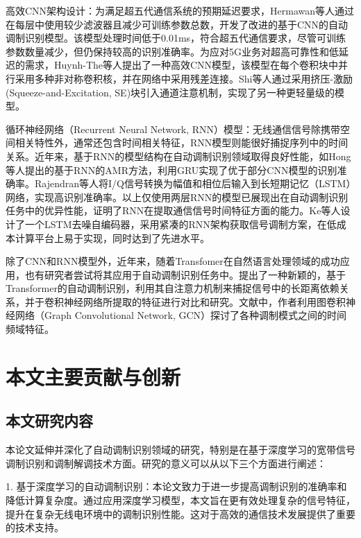 高效CNN架构设计：为满足超五代通信系统的预期延迟要求，Hermawan等人通过在每层中使用较少滤波器且减少可训练参数总数，开发了改进的基于CNN的自动调制识别模型\cite{hermawan2020cnn}。该模型处理时间低于0.01ms，符合超五代通信要求，尽管可训练参数数量减少，但仍保持较高的识别准确率。为应对5G业务对超高可靠性和低延迟的需求，Huynh-The等人提出了一种高效CNN模型，该模型在每个卷积块中并行采用多种非对称卷积核，并在网络中采用残差连接\cite{huynh2020mcnet}。Shi等人通过采用挤压-激励(Squeeze-and-Excitation, SE)块引入通道注意机制，实现了另一种更轻量级的模型\cite{shi2022combining}。

循环神经网络（Recurrent Neural Network, RNN）模型：无线通信信号除携带空间相关特性外，通常还包含时间相关特征，RNN模型则能很好捕捉序列中的时间关系。近年来，基于RNN的模型结构在自动调制识别领域取得良好性能，如Hong等人提出的基于RNN的AMR方法，利用GRU实现了优于部分CNN模型的识别准确率\cite{hong2017automatic}。Rajendran等人将I/Q信号转换为幅值和相位后输入到长短期记忆（LSTM）网络，实现高识别准确率\cite{rajendran2018deep}。以上仅使用两层RNN的模型已展现出在自动调制识别任务中的优异性能，证明了RNN在提取通信信号时间特征方面的能力。Ke等人设计了一个LSTM去噪自编码器，采用紧凑的RNN架构获取信号调制方案，在低成本计算平台上易于实现，同时达到了先进水平\cite{ke2021real}。

除了CNN和RNN模型外，近年来，随着Transfomer在自然语言处理领域的成功应用，也有研究者尝试将其应用于自动调制识别任务中。\cite{hamidi2021mcformer}提出了一种新颖的，基于Transformer的自动调制识别，利用其自注意力机制来捕捉信号中的长距离依赖关系，并于卷积神经网络所提取的特征进行对比和研究。文献\cite{tonchev2022automatic}中，作者利用图卷积神经网络（Graph Convolutional Network, GCN）探讨了各种调制模式之间的时间频域特征。

\section{本文主要贡献与创新}\label{sec:background}

\subsection{本文研究内容}\label{sec:background}

本论文延伸并深化了自动调制识别领域的研究，特别是在基于深度学习的宽带信号调制识别和调制解调技术方面。研究的意义可以从以下三个方面进行阐述：

1. 基于深度学习的自动调制识别：本论文致力于进一步提高调制识别的准确率和降低计算复杂度。通过应用深度学习模型，本文旨在更有效处理复杂的信号特征，提升在复杂无线电环境中的调制识别性能。这对于高效的通信技术发展提供了重要的技术支持。


